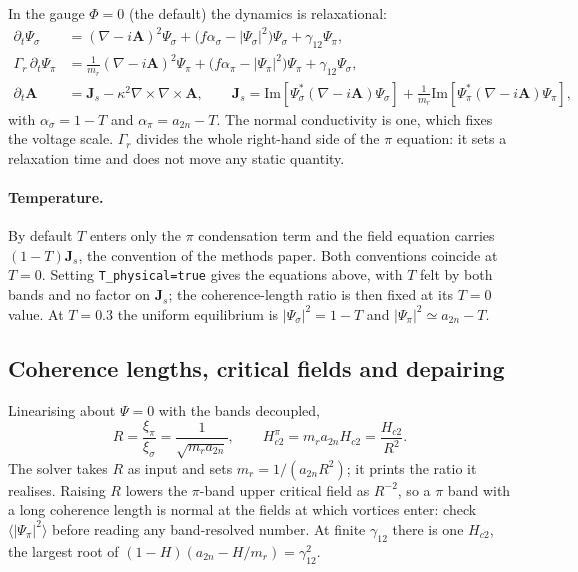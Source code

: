 \documentclass[11pt,a4paper]{article}
\newcommand{\Hc}[1]{H_{c#1}}
\newcommand{\code}[1]{\texttt{#1}}
\begin{document}
In the gauge $\Phi=0$ (the default) the dynamics is relaxational:
\begin{align}
  \partial_t\Psi_\sigma &= (\nabla-i\mathbf A)^2\Psi_\sigma
     + \bigl(f\alpha_\sigma-|\Psi_\sigma|^2\bigr)\Psi_\sigma + \gamma_{12}\Psi_\pi ,\\
  \Gamma_r\,\partial_t\Psi_\pi &= \frac{1}{m_r}(\nabla-i\mathbf A)^2\Psi_\pi
     + \bigl(f\alpha_\pi-|\Psi_\pi|^2\bigr)\Psi_\pi + \gamma_{12}\Psi_\sigma ,\\
  \partial_t\mathbf A &= \mathbf J_s - \kappa^2\nabla\times\nabla\times\mathbf A ,
  \qquad
  \mathbf J_s=\mathrm{Im}[\Psi_\sigma^*(\nabla-i\mathbf A)\Psi_\sigma]
     +\frac{1}{m_r}\mathrm{Im}[\Psi_\pi^*(\nabla-i\mathbf A)\Psi_\pi] ,
\end{align}
with $\alpha_\sigma=1-T$ and $\alpha_\pi=a_{2n}-T$. The normal conductivity
is one, which fixes the voltage scale. $\Gamma_r$ divides the whole
right-hand side of the $\pi$ equation: it sets a relaxation time and does not
move any static quantity.

\paragraph{Temperature.} By default $T$ enters only the $\pi$ condensation
term and the field equation carries $(1-T)\mathbf J_s$, the convention of
the methods paper. Both conventions
coincide at $T=0$. Setting \code{T\_physical=true} gives the equations
above, with $T$ felt by both bands and no factor on $\mathbf J_s$; the
coherence-length ratio is then fixed at its $T=0$ value. At $T=0.3$ the
uniform equilibrium is $|\Psi_\sigma|^2=1-T$ and $|\Psi_\pi|^2\simeq a_{2n}-T$.

\subsection{Coherence lengths, critical fields and depairing}

Linearising about $\Psi=0$ with the bands decoupled,
\begin{equation}
  R=\frac{\xi_\pi}{\xi_\sigma}=\frac{1}{\sqrt{m_r a_{2n}}},\qquad
  \Hc2^\pi=m_ra_{2n}\Hc2=\frac{\Hc2}{R^2}.
\end{equation}
The solver takes $R$ as input and sets $m_r=1/(a_{2n}R^2)$; it prints the
ratio it realises. Raising $R$ lowers the $\pi$-band upper critical field as
$R^{-2}$, so a $\pi$ band with a long coherence length is normal at the
fields at which vortices enter: check $\langle|\Psi_\pi|^2\rangle$ before
reading any band-resolved number. At finite $\gamma_{12}$ there is one
$\Hc2$, the largest root of $(1-H)(a_{2n}-H/m_r)=\gamma_{12}^2$.
\end{document}
